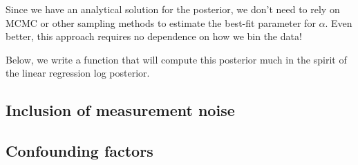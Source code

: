 Since we have an analytical solution for the posterior, we don't need to rely on MCMC or other sampling methods to estimate the best-fit parameter for $\alpha$. Even better, this approach requires no dependence on how we bin the data!

Below, we write a function that will compute this posterior much in the spirit of the linear regression log posterior.

\subsection*{Inclusion of measurement noise}

\subsection*{Confounding factors}
